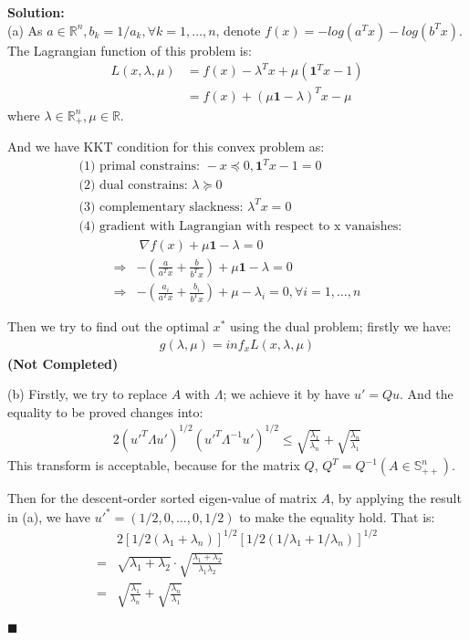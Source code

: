\documentclass{article}
\newenvironment{solution}                               %
{\textbf{Solution:} \\}{$\blacksquare$\newline}         %
\newcommand{\leadto}{\Rightarrow}                       %
\newcommand{\domR}{\mathbb{R}}                          %
\newcommand{\domS}{\mathbb{S}}                          %
\newcommand{\vecOne}{\textbf{1}}                        %
\begin{document}
\begin{solution}
    (a) As $a \in \domR^n, b_k=1/a_k, \forall k=1, \dots, n$,
        denote $f(x) = -log(a^T x) - log(b^T x)$.
        The Lagrangian function of this problem is:
        \begin{align*}
            L(x, \lambda, \mu) &= f(x) - \lambda^T x + \mu (\vecOne^T x - 1) \\
            & = f(x) + (\mu\vecOne - \lambda)^T x - \mu
        \end{align*}
        where $\lambda \in \domR^n_+, \mu \in \domR$.

        And we have KKT condition for this convex problem as:
        \begin{align*}
            & \text{(1) primal constrains: } -x \preceq 0, \vecOne^T x - 1 = 0 \\
            & \text{(2) dual constrains: } \lambda \succeq 0 \\
            & \text{(3) complementary slackness: } \lambda^T x = 0 \\
            & \text{(4) gradient with Lagrangian with respect to x vanaishes: }
        \end{align*}
        \begin{align*}
            &\ \nabla f(x) + \mu\vecOne - \lambda = 0 \\
            \leadto & - (\frac{a}{a^T x} + \frac{b}{b^T x}) + \mu\vecOne - \lambda = 0 \\
            \leadto & - (\frac{a_i}{a^T x} + \frac{b_i}{b^T x}) + \mu - \lambda_i = 0, \forall i=1, \dots, n
        \end{align*}

        Then we try to find out the optimal $x^*$ using the dual problem; firstly we have:
        \begin{align*}
            g(\lambda, \mu) = inf_{x} L(x, \lambda, \mu)
        \end{align*}
        \textbf{(Not Completed)}

    (b) Firstly, we try to replace $A$ with $\Lambda$; we achieve it by have $u' = Qu$.
    And the equality to be proved changes into:
    \begin{align*}
        2 (u'^T \Lambda u')^{1/2} (u'^T \Lambda^{-1} u')^{1/2}
        \leq \sqrt{\frac{\lambda_1}{\lambda_n}} + \sqrt{\frac{\lambda_n}{\lambda_1}}
    \end{align*}
    This transform is acceptable, because for the matrix $Q$, $Q^T = Q^{-1} (A \in \domS^n_{++})$.

    Then for the descent-order sorted eigen-value of matrix $A$, by applying the result in (a), we have $u'^* = (1/2, 0, \dots, 0, 1/2)$ to make the equality hold. That is:
    \begin{align*}
        &2 [1/2 (\lambda_1 + \lambda_n)]^{1/2} [1/2 (1/\lambda_1 + 1/\lambda_n)]^{1/2} \\
        =& \sqrt{\lambda_1 + \lambda_2} \cdot \sqrt{\frac{\lambda_1+\lambda_2}{\lambda_1\lambda_2}} \\
        =&\sqrt{\frac{\lambda_1}{\lambda_n}} + \sqrt{\frac{\lambda_n}{\lambda_1}}
    \end{align*}

\end{solution}
\end{document}

